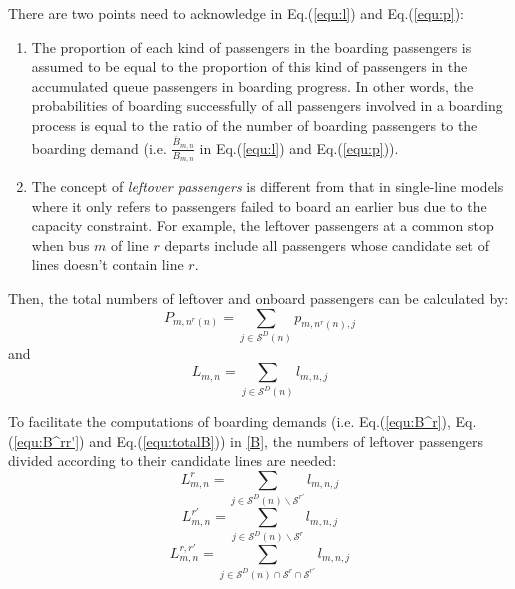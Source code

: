 \documentclass[smallextended]{svjour3}       %
\begin{document}
\begin{Abstract}
There are two points need to acknowledge in \textup{Eq.(\ref{equ:l}) and Eq.(\ref{equ:p})}:
\begin{enumerate}[1)]
    \item The proportion of each kind of passengers in the boarding passengers is assumed to
    be equal to the proportion of this kind of passengers in the accumulated queue passengers in boarding progress. 
    In other words, the probabilities of boarding successfully of all passengers involved in a boarding process 
    is equal to the ratio of the number of boarding passengers to the boarding demand (i.e. $\frac{\overline{B}_{m,n}}{B_{m,n}}$ in Eq.(\ref{equ:l}) and Eq.(\ref{equ:p})).
    \item  The concept of \textit{leftover passengers} is different 
    from that in single-line models where it only refers to passengers failed to board an earlier bus 
    due to the capacity constraint.
    For example, the leftover passengers at a common stop when bus $m$ of line $r$ departs include all passengers 
    whose candidate set of lines doesn't contain line $r$.
\end{enumerate}

Then, the total numbers of leftover and onboard passengers can be calculated by:
\begin{equation}
    \label{equ:P}
    P_{m,n^{r}(n)} = \sum_{j\in \mathcal{S}^{D}(n)} p_{m,n^{r}(n),j}
\end{equation}
and
\begin{equation}
    L_{m,n} = \sum_{j\in\mathcal{S}^{D}(n)} l_{m,n,j}
\end{equation}

To facilitate the computations of boarding demands 
(i.e. \textup{Eq.(\ref{equ:B^r}), Eq.(\ref{equ:B^rr'}) and Eq.(\ref{equ:totalB})}) in \ref{B}, 
the numbers of leftover passengers divided according to their candidate lines are needed:
\begin{equation}
    \label{equ:Lr}
    L_{m,n}^{r} = \sum_{j\in\mathcal{S}^{D}(n)\backslash\mathcal{S}^{r'}} l_{m,n,j}
\end{equation}
\begin{equation}
    L_{m,n}^{r'} = \sum_{j\in\mathcal{S}^{D}(n)\backslash\mathcal{S}^{r}} l_{m,n,j}
\end{equation}
\begin{equation}
    L_{m,n}^{r,r'} = \sum_{j\in\mathcal{S}^{D}(n)\cap \mathcal{S}^{r}\cap \mathcal{S}^{r'}} l_{m,n,j}
\end{equation}


\end{Abstract}
\end{document}
